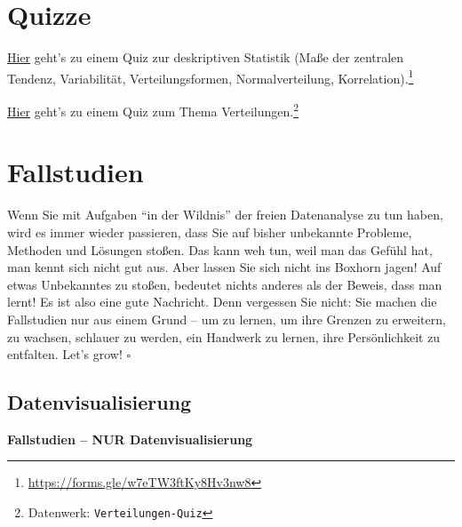 \documentclass[
  a4paper,
]{scrbook}
\theoremstyle{definition}
\theoremstyle{definition}
\theoremstyle{definition}
\theoremstyle{remark}
\begin{document}
\section{Quizze}\label{quizze}

\href{https://forms.gle/w7eTW3ftKy8Hv3nw8}{Hier} geht's zu einem Quiz
zur deskriptiven Statistik (Maße der zentralen Tendenz, Variabilität,
Verteilungsformen, Normalverteilung, Korrelation).\footnote{\url{https://forms.gle/w7eTW3ftKy8Hv3nw8}}

\href{https://datenwerk.netlify.app/\#category=Verteilungen-Quiz}{Hier}
geht's zu einem Quiz zum Thema Verteilungen.\footnote{Datenwerk:
  \texttt{Verteilungen-Quiz}}

\section{Fallstudien}\label{fallstudien-3}

\begin{tcolorbox}[enhanced jigsaw, colbacktitle=quarto-callout-important-color!10!white, bottomrule=.15mm, left=2mm, breakable, rightrule=.15mm, coltitle=black, title=\textcolor{quarto-callout-important-color}{\faExclamation}\hspace{0.5em}{Wichtig}, colback=white, leftrule=.75mm, titlerule=0mm, opacityback=0, bottomtitle=1mm, toprule=.15mm, arc=.35mm, toptitle=1mm, opacitybacktitle=0.6, colframe=quarto-callout-important-color-frame]

Wenn Sie mit Aufgaben ``in der Wildnis'' der freien Datenanalyse zu tun
haben, wird es immer wieder passieren, dass Sie auf bisher unbekannte
Probleme, Methoden und Lösungen stoßen. Das kann weh tun, weil man das
Gefühl hat, man kennt sich nicht gut aus. Aber lassen Sie sich nicht ins
Boxhorn jagen! Auf etwas Unbekanntes zu stoßen, bedeutet nichts anderes
als der Beweis, dass man lernt! Es ist also eine gute Nachricht. Denn
vergessen Sie nicht: Sie machen die Fallstudien nur aus einem Grund --
um zu lernen, um ihre Grenzen zu erweitern, zu wachsen, schlauer zu
werden, ein Handwerk zu lernen, ihre Persönlichkeit zu entfalten. Let's
grow! \(\square\)

\end{tcolorbox}

\subsection{Datenvisualisierung}\label{datenvisualisierung}

\textbf{Fallstudien -- NUR Datenvisualisierung}
\end{document}
